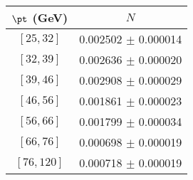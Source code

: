 \begin{tabular}{c||c}
$\pt$ (GeV) & $N$  \\
\hline
$[25, 32]$ & 0.002502 $\pm$ 0.000014\\
$[32, 39]$ & 0.002636 $\pm$ 0.000020\\
$[39, 46]$ & 0.002908 $\pm$ 0.000029\\
$[46, 56]$ & 0.001861 $\pm$ 0.000023\\
$[56, 66]$ & 0.001799 $\pm$ 0.000034\\
$[66, 76]$ & 0.000698 $\pm$ 0.000019\\
$[76, 120]$ & 0.000718 $\pm$ 0.000019\\
\end{tabular}
